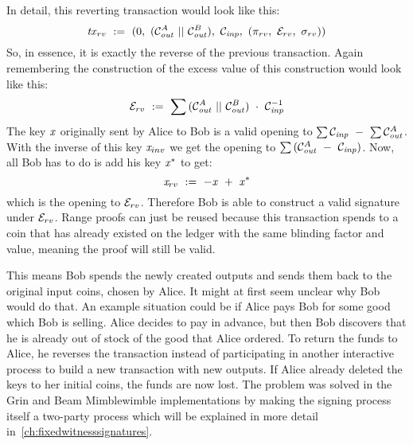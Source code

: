 In detail, this reverting transaction would look like this:
\[ \mathit{tx}_{rv} ~:=~ (0 ,~ (\mathcal{C}_{\mathit{out}}^A ~||~ \mathcal{C}_{\mathit{out}}^B) ,~ \mathcal{C}_{\mathit{inp}} ,~ (\pi_{rv} ,~ \mathcal{E}_{rv} ,~ \sigma_{rv}) ) \]
So, in essence, it is exactly the reverse of the previous transaction.
Again remembering the construction of the excess value of this construction would look like this:
\[ \mathcal{E}_{rv} ~:=~ \sum{(\mathcal{C}_{\mathit{out}}^A ~||~\mathcal{C}_{\mathit{out}}^B) ~\cdot~\mathcal{C}_{\mathit{inp}}^{-1}} \]
The key $\mathit{x}$ originally sent by Alice to Bob is a valid opening to $\sum{\mathcal{C}_{\mathit{inp}}} ~-~ \sum{\mathcal{C}_{\mathit{out}}^A}$.
With the inverse of this key $\mathit{x}_{inv}$ we get the opening to $\sum{(\mathcal{C}_{\mathit{out}}^A ~-~\mathcal{C}_{\mathit{inp}})}$.
Now, all Bob has to do is add his key $\mathit{x}^*$ to get:
\[ \mathit{x}_{rv} ~:=~ -\mathit{x} ~+~ \mathit{x}^* \]
which is the opening to $\mathcal{E}_{rv}$.
Therefore Bob is able to construct a valid signature under $\mathcal{E}_{rv}$.
Range proofs can just be reused because this transaction spends to a coin that has already existed on the ledger with the same blinding factor and value, meaning the proof will still be valid.

This means Bob spends the newly created outputs and sends them back to the original input coins, chosen by Alice.
It might at first seem unclear why Bob would do that.
An example situation could be if Alice pays Bob for some good which Bob is selling.
Alice decides to pay in advance, but then Bob discovers that he is already out of stock of the good that Alice ordered.
To return the funds to Alice, he reverses the transaction instead of participating in another interactive process to build a new transaction with new outputs.
If Alice already deleted the keys to her initial coins, the funds are now lost.
The problem was solved in the Grin and Beam Mimblewimble implementations by making the signing process itself a two-party process which will be explained in more detail in~\cref{ch:fixedwitnesssignatures}.

